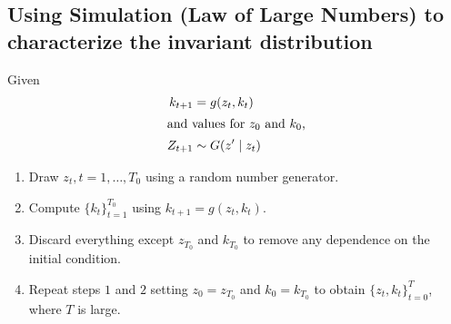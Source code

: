 \documentclass[11pt]{article}
\begin{document}
\subsection{Using Simulation (Law of Large Numbers) to characterize the invariant distribution}
\label{sec:orga423cd6}
Given 
\begin{align*}
k_{t + 1} &= g(z_t, k_t)\\
\intertext{and values for $z_0$ and $k_0$,}
Z_{t + 1} &\sim G(z' \mid z_t)
\end{align*}
\begin{enumerate}
\item Draw $z_t, t = 1, \ldots, T_0$ using a random number generator.
\item Compute $\{k_t\}^{T_0}_{t = 1}$ using $k_{t + 1} = g(z_t, k_t)$.
\item Discard everything except $z_{T_0}$ and $k_{T_0}$ to remove any dependence on the initial condition.
\item Repeat steps $1$ and $2$ setting $z_0 = z_{T_0}$ and $k_0 = k_{T_0}$ to obtain $\{z_t, k_t\}^T_{t = 0}$, where $T$ is large.
\end{enumerate}
\end{document}
